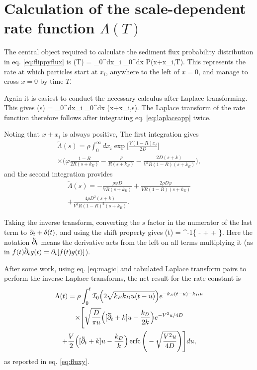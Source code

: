 \section{Calculation of the scale-dependent rate function $\Lambda(T)$}
\label{sec:fluxconstant}
The central object required to calculate the sediment flux probability distribution in eq. \ref{eq:flippyflux} is 
\be \Lambda(T) = \rho \int_0^\infty dx_i \int_0^\infty dx P(x+x_i,T).\ee
This represents the rate at which particles start at $x_i$, anywhere to the left of $x=0$, and manage to cross $x=0$ by time $T$.

Again it is easiest to conduct the necessary calculus after Laplace transforming. This gives 
\be \tilde{\Lambda}(s) = \rho \int_0^\infty dx_i \int_0^\infty dx (x+x_i,s).\ee
The Laplace transform of the rate function therefore follows after integrating eq. \ref{eq:laplaceapp} twice.

Noting that $x+x_i$ is always positive,
The first integration gives
\begin{multline} \tilde{\Lambda}(s) = \rho \int_0^\infty dx_i \exp\Big[\frac{V(1-R)x_i}{2D}\Big]\\ 
	\times\Big(\varphi \frac{1-R}{2R(s+k_E)} - \frac{\varphi}{R(s+k_E)} - \frac{2D(s+k)}{V^2R(1-R)(s+k_E)}\Big), \end{multline}
and the second integration provides
\begin{multline}  \tilde{\Lambda}(s) = -\frac{\rho \varphi D}{V R(s+k_E)}  + \frac{2\rho D\varphi}{VR(1-R)(s+k_E)} \\ + \frac{4\rho D^2(s+k)}{V^3R(1-R)^2(s+k_E)}. 
	\label{eq:laplacefluxrate}\end{multline}

Taking the inverse transform, converting the $s$ factor in the numerator of the last term to $\partial_t + \delta(t)$, and using the shift property gives \citep[e.g.][]{Arfken1985}
\be \Lambda(t) = \rho {}^{-1}\Bigg\{ -  +  + \Bigg\}.\ee
Here the notation $\cev{\pt}$ means the derivative acts from the left on all terms multiplying it (as in $f(t)\cev{\pt} g(t) = \pt [f(t)g(t)]$).

After some work, using eq. \ref{eq:magic} and tabulated Laplace transform pairs \citep[e.g.][]{Arfken1985,Prudnikov1992a} to perform the inverse Laplace transforms, the net result for the rate constant is
\begin{multline} 
	\Lambda(t) = \rho \int_0^t \mathcal{I}_0\Big(2\sqrt{k_Ek_Du(t-u)}\Big)e^{-k_E(t-u)-k_D u} \\
	\times \Bigg[\sqrt{\frac{D}{\pi u}}\Big([\cev{\partial_t} + k]u-\frac{k_D}{2 k}\Big)e^{-V^2 u/4D}  \\ + \frac{V}{2}\Big([\cev{\partial_t} + k]u -\frac{k_D}{k}\Big) \erfc\Bigg(-\sqrt{\frac{V^2 u}{4D}}\Bigg)\Bigg] du,
\end{multline}
as reported in eq. \ref{eq:fluxy}.

